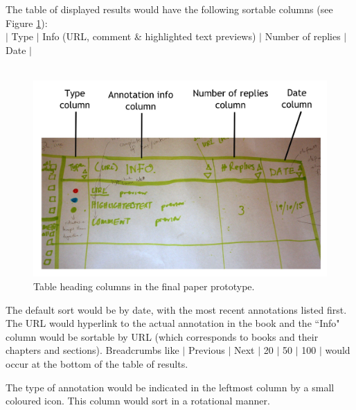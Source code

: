 The table of displayed results would have the following sortable columns (see Figure \ref{fig:TableHead}): \\
$\vert$ Type $\vert$ Info (URL, comment \& highlighted text previews) $\vert$ Number of replies $\vert$ Date $\vert$\\
\\
\begin{figure}[h!]
    \centering
    \includegraphics[width=\textwidth]{Figures/PDColumnHeadingLabels.jpg}
 \caption{Table heading columns in the final paper prototype.}
 \label{fig:TableHead}
\end{figure}
The default sort would be by date, with the most recent annotations listed first. The URL would hyperlink to the actual annotation in the book and the ``Info" column would be sortable by URL (which corresponds to books and their chapters and sections). Breadcrumbs like $\vert$ Previous $\vert$ Next $\vert$ 20 $\vert$ 50 $\vert$ 100 $\vert$ would occur at the bottom of the table of results. 

The type of annotation would be indicated in the leftmost column by a small coloured icon. This column would sort in a rotational manner. 


